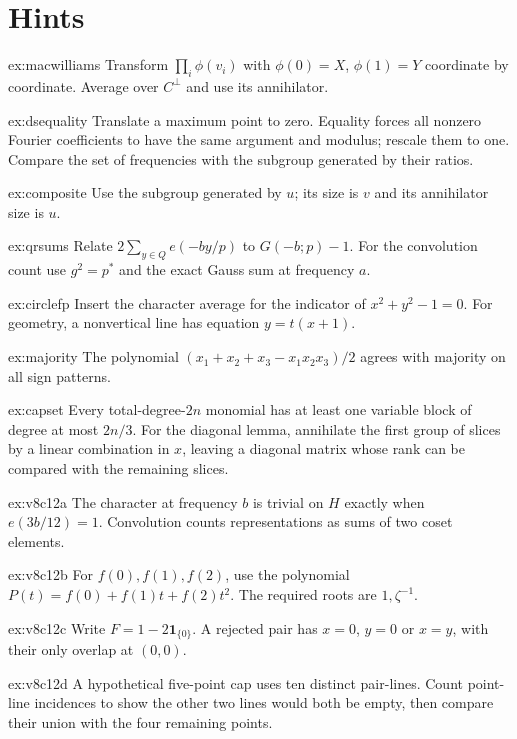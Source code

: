 \section{Hints}

\begin{hint}{ex:macwilliams}
Transform $\prod_i\phi(v_i)$ with $\phi(0)=X$, $\phi(1)=Y$ coordinate by coordinate. Average over $C^\perp$ and use its annihilator.
\end{hint}
\begin{hint}{ex:dsequality}
Translate a maximum point to zero. Equality forces all nonzero Fourier coefficients to have the same argument and modulus; rescale them to one. Compare the set of frequencies with the subgroup generated by their ratios.
\end{hint}
\begin{hint}{ex:composite}
Use the subgroup generated by $u$; its size is $v$ and its annihilator size is $u$.
\end{hint}
\begin{hint}{ex:qrsums}
Relate $2\sum_{y\in Q}e(-by/p)$ to $G(-b;p)-1$. For the convolution count use $g^2=p^*$ and the exact Gauss sum at frequency $a$.
\end{hint}
\begin{hint}{ex:circlefp}
Insert the character average for the indicator of $x^2+y^2-1=0$. For geometry, a nonvertical line has equation $y=t(x+1)$.
\end{hint}
\begin{hint}{ex:majority}
The polynomial $(x_1+x_2+x_3-x_1x_2x_3)/2$ agrees with majority on all sign patterns.
\end{hint}
\begin{hint}{ex:capset}
Every total-degree-$2n$ monomial has at least one variable block of degree at most $2n/3$. For the diagonal lemma, annihilate the first group of slices by a linear combination in $x$, leaving a diagonal matrix whose rank can be compared with the remaining slices.
\end{hint}
\begin{hint}{ex:v8c12a}
The character at frequency $b$ is trivial on $H$ exactly when $e(3b/12)=1$. Convolution counts representations as sums of two coset elements.
\end{hint}
\begin{hint}{ex:v8c12b}
For $f(0),f(1),f(2)$, use the polynomial $P(t)=f(0)+f(1)t+f(2)t^2$. The required roots are $1,\zeta^{-1}$.
\end{hint}
\begin{hint}{ex:v8c12c}
Write $F=1-2\mathbf1_{\{0\}}$. A rejected pair has $x=0$, $y=0$ or $x=y$, with their only overlap at $(0,0)$.
\end{hint}
\begin{hint}{ex:v8c12d}
A hypothetical five-point cap uses ten distinct pair-lines. Count point-line incidences to show the other two lines would both be empty, then compare their union with the four remaining points.
\end{hint}

